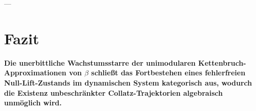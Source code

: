 \documentclass[11pt,a4paper]{article}
\theoremstyle{definition}
\begin{document}
	---
	
	\section{Fazit}
	
	\textbf{Die unerbittliche Wachstumsstarre der unimodularen Kettenbruch-Approximationen von $\beta$ schließt das Fortbestehen eines fehlerfreien Null-Lift-Zustands im dynamischen System kategorisch aus, wodurch die Existenz unbeschränkter Collatz-Trajektorien algebraisch unmöglich wird.}
	
\end{document}
